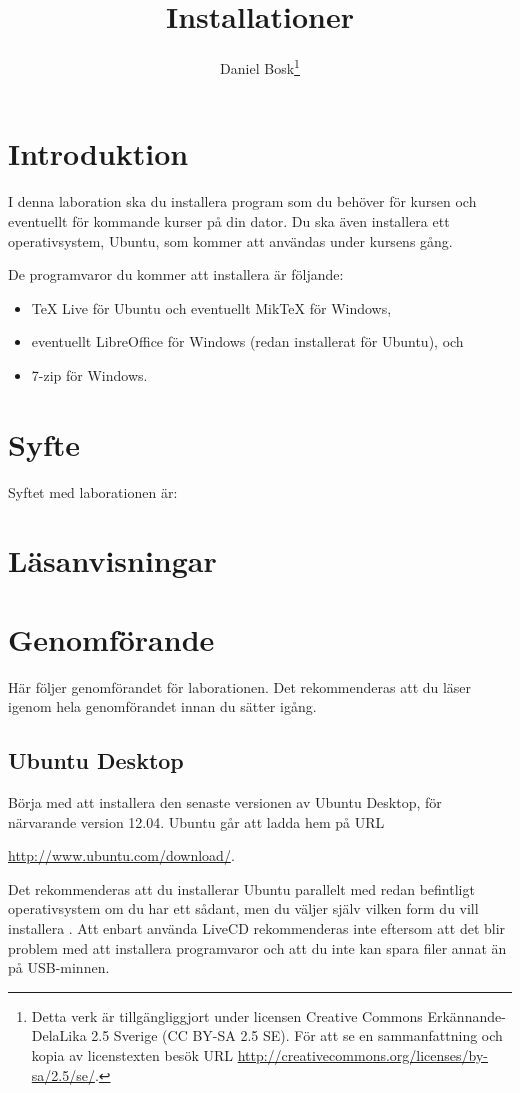 \documentclass[a4paper]{miunasgn}
\title{Installationer}
\author{Daniel Bosk\footnote{%
	Detta verk är tillgängliggjort under licensen Creative Commons 
	Erkännande-DelaLika 2.5 Sverige (CC BY-SA 2.5 SE).
	För att se en sammanfattning och kopia av licenstexten besök URL 
	\url{http://creativecommons.org/licenses/by-sa/2.5/se/}.
}}
\date{\svnId}
\begin{document}
\maketitle
\thispagestyle{foot}
\tableofcontents


\section{Introduktion}
\label{sec:Introduktion}
I denna laboration ska du installera program som du behöver för kursen och 
eventuellt för kommande kurser på din dator.
Du ska även installera ett operativsystem, Ubuntu, som kommer att användas 
under kursens gång.

De programvaror du kommer att installera är följande:
\begin{itemize}
	\item TeX Live för Ubuntu och eventuellt MikTeX för Windows,
	\item eventuellt LibreOffice för Windows (redan installerat för Ubuntu), och
	\item 7-zip för Windows.
\end{itemize}


\section{Syfte}
\label{sec:Syfte}
Syftet med laborationen är:
\begin{itemize}
  
\end{itemize}


\section{Läsanvisningar}
\label{sec:Lasanvisningar}



\section{Genomförande}
\label{sec:Genomforande}
Här följer genomförandet för laborationen.
Det rekommenderas att du läser igenom hela genomförandet innan du sätter igång.

\subsection{Ubuntu Desktop}
\noindent
Börja med att installera den senaste versionen av Ubuntu Desktop, för 
närvarande version 12.04.
Ubuntu går att ladda hem på URL
\begin{center}
	\url{http://www.ubuntu.com/download/}.
\end{center}
Det rekommenderas att du installerar Ubuntu parallelt med redan befintligt 
operativsystem om du har ett sådant, men du väljer själv vilken form du vill 
installera \citep[för detaljer, se][]{UbuntuInstall}.
Att enbart använda LiveCD rekommenderas inte eftersom att det blir problem med 
att installera programvaror och att du inte kan spara filer annat än på 
USB-minnen.
\end{document}
